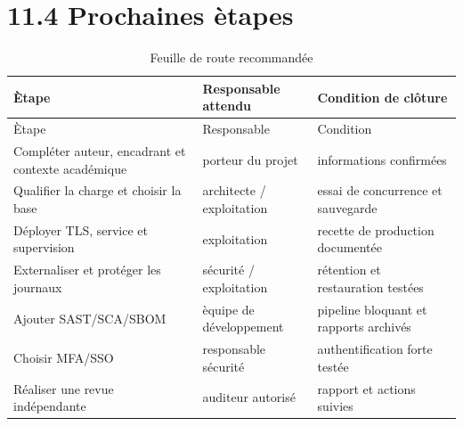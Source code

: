 \section*{11.4 Prochaines \`etapes}
\begin{longtable}{p{5.4cm}p{4cm}p{5.3cm}}
\caption{Feuille de route recommand\'ee}\\
\toprule
\rowcolor{AuditLight}\`Etape & Responsable attendu & Condition de cl\^oture\\
\midrule\endfirsthead
\toprule \`Etape & Responsable & Condition\\\midrule\endhead
Compl\'eter auteur, encadrant et contexte acad\'emique & porteur du projet & informations confirm\'ees\\
Qualifier la charge et choisir la base & architecte / exploitation & essai de concurrence et sauvegarde\\
D\'eployer TLS, service et supervision & exploitation & recette de production document\'ee\\
Externaliser et prot\'eger les journaux & s\'ecurit\'e / exploitation & r\'etention et restauration test\'ees\\
Ajouter SAST/SCA/SBOM & \`equipe de d\'eveloppement & pipeline bloquant et rapports archiv\'es\\
Choisir MFA/SSO & responsable s\'ecurit\'e & authentification forte test\'ee\\
R\'ealiser une revue ind\'ependante & auditeur autoris\'e & rapport et actions suivies\\
\bottomrule
\end{longtable}
